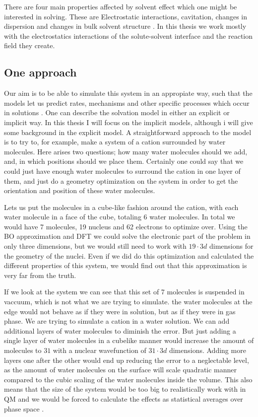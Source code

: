 \documentclass[../master_thesis.tex]{subfiles}
\begin{document}
There are four main properties affected by solvent effect which one might be
interested in solving. These are Electrostatic interactions, cavitation,
changes in dispersion and changes in bulk solvent structure \cite{Cramer:2004}.
In this thesis we work mostly with the electrostatics interactions of the
solute-solvent interface and the reaction field they create.

\subsection{One approach}
Our aim is to be able to simulate this system in an appropiate way, such that
the models let us predict rates, mechanisms and other specific processes which
occur in solutions \cite{Tomasi:1994wt}.
One can describe the solvation model in either an explicit or implicit way. In
this thesis I will focus on the implicit models, although i will give some
background in the explicit model.
A straightforward approach to the model is to try to, for example, make a
system of a  cation surrounded by water molecules. Here arises two
questions; how many water molecules should we add, and, in which positions
should we place them. Certainly one could say that we could just have enough
water molecules to surround the cation in one layer of them,  and just do a
geometry optimization \cite{Jensen:2017} on the system in order to get the
orientation and position of these water molecules.

Lets us put the molecules in a cube-like fashion around the cation, with each
water molecule in a face of the cube, totaling 6 water molecules. In total we
would have 7 molecules, 19 nucleus and 62 electrons to optimize over. Using the
\ac{BO} approximation and \ac{DFT} we could solve the electronic part of the
problem in only three dimensions, but we would still need to work with
$19\cdot3d$ dimensions for the geometry of the nuclei. Even if we did do this
optimization and calculated the different properties of this system, we would
find out that this approximation is very far from the truth.

If we look at the system we can see that this set of 7 molecules is suspended in
vaccuum, which is not what we are trying to simulate. the water molecules at
the edge would not behave as if they were in solution, but as if they were in
gas phase. We are trying to simulate a  cation in a water solution.
We can add additional layers of water molecules to diminish the error. But
just adding a single layer of water molecules in a cubelike manner would
increase the amount of molecules to $31$ with a nuclear wavefunction of
$31\cdot3d$ dimensions. Adding more layers one after the other would end up
reducing the error to a neglectable level, as the amount of water molecules on
the surface will scale quadratic manner compared to the cubic scaling of the
water molecules inside the volume. This also means that the size of the system
would be too big to realistically work with in \ac{QM} and we would be forced to
calculate the effects as statistical averages over phase space
\cite{Cramer:2004}.
\end{document}
